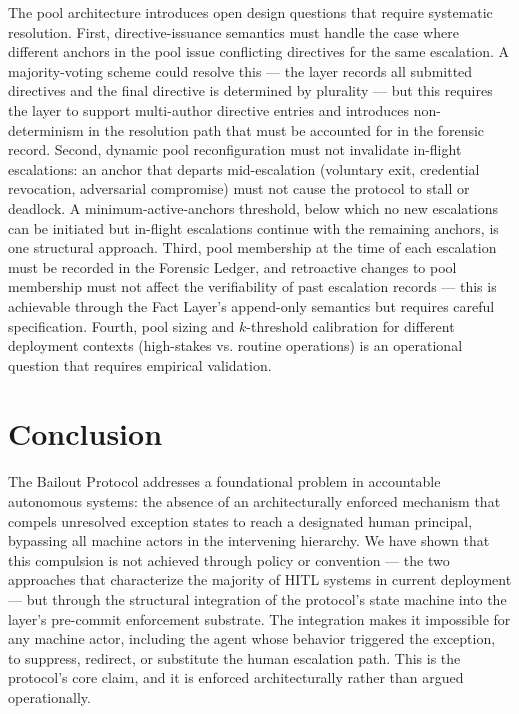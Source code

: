 The pool architecture introduces open design questions that require systematic resolution. First, directive-issuance semantics must handle the case where different anchors in the pool issue conflicting directives for the same escalation. A majority-voting scheme could resolve this --- the \fact{} layer records all submitted directives and the final directive is determined by plurality --- but this requires the \fact{} layer to support multi-author directive entries and introduces non-determinism in the resolution path that must be accounted for in the forensic record. Second, dynamic pool reconfiguration must not invalidate in-flight escalations: an anchor that departs mid-escalation (voluntary exit, credential revocation, adversarial compromise) must not cause the protocol to stall or deadlock. A minimum-active-anchors threshold, below which no new escalations can be initiated but in-flight escalations continue with the remaining anchors, is one structural approach. Third, pool membership at the time of each escalation must be recorded in the Forensic Ledger, and retroactive changes to pool membership must not affect the verifiability of past escalation records --- this is achievable through the Fact Layer's append-only semantics but requires careful specification. Fourth, pool sizing and $k$-threshold calibration for different deployment contexts (high-stakes vs. routine operations) is an operational question that requires empirical validation.

\section{Conclusion}\label{sec:conclusion}

The Bailout Protocol addresses a foundational problem in accountable autonomous systems: the absence of an architecturally enforced mechanism that compels unresolved exception states to reach a designated human principal, bypassing all machine actors in the intervening hierarchy. We have shown that this compulsion is not achieved through policy or convention --- the two approaches that characterize the majority of HITL systems in current deployment --- but through the structural integration of the protocol's state machine into the \fact{} layer's pre-commit enforcement substrate. The integration makes it impossible for any machine actor, including the agent whose behavior triggered the exception, to suppress, redirect, or substitute the human escalation path. This is the protocol's core claim, and it is enforced architecturally rather than argued operationally.

